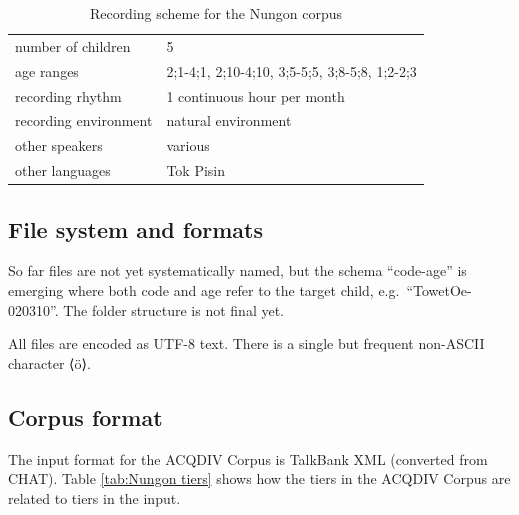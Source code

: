 \documentclass[a4paper, 11pt]{book}
\begin{document}
\begin{table}[ht]
	\centering
	\begin{tabular}{ll}
		\toprule
		number of children 	& 5 \\
		age ranges 			& 2;1-4;1, 2;10-4;10, 3;5-5;5, 3;8-5;8, 1;2-2;3 \\
		recording rhythm 	& 1 continuous hour per month \\
		recording environment & natural environment \\
		other speakers 		& various \\
		other languages		& Tok Pisin \\
		\bottomrule
	\end{tabular}
	\caption{Recording scheme for the Nungon corpus}
	\label{tab:Nungon recording scheme}
\end{table}

\subsection{File system and formats}
So far files are not yet systematically named, but the schema “code-age” is emerging where both code and age refer to the target child, e.g.\ “TowetOe-020310”. The folder structure is not final yet. 

All files are encoded as UTF-8 text. There is a single but frequent non-ASCII character ⟨ö⟩. 

\subsection{Corpus format}
The input format for the ACQDIV Corpus is TalkBank XML (converted from CHAT). Table \autoref{tab:Nungon tiers} shows how the tiers in the ACQDIV Corpus are related to tiers in the input.
\end{document}
